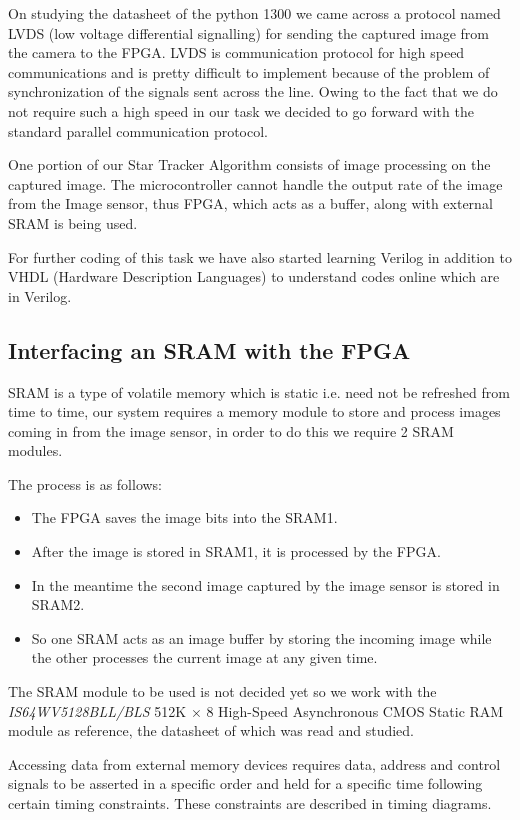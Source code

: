 \documentclass[../../main.tex]{subfiles}
\begin{document}
On studying the datasheet of the python 1300 we came across a protocol named LVDS (low voltage differential signalling) for sending the captured image from the camera to the FPGA. LVDS is communication protocol for high speed communications and is pretty difficult to implement because of the problem of synchronization of the signals sent across the line. Owing to the fact that we do not require such a high speed in our task we decided to go forward with the standard parallel communication protocol.

One portion of our Star Tracker Algorithm consists of image processing on the captured image.  The microcontroller cannot handle the output rate of the image from the Image sensor, thus FPGA, which acts as a buffer, along with external SRAM is being used. %

For further coding of this task we have also started learning Verilog in addition to VHDL (Hardware Description Languages) to understand codes online which are in Verilog.

\subsection{Interfacing an SRAM with the FPGA}
SRAM is a type of volatile memory which is static i.e. need not be refreshed from time to time, our system requires a memory module to store and process images coming in from the image sensor, in order to do this we require 2 SRAM modules.

The process is as follows:
\begin{itemize}
    \item The FPGA saves the image bits into the SRAM1.
    \item After the image is stored in SRAM1, it is processed by the FPGA.
    \item In the meantime the second image captured by the image sensor is stored in SRAM2.
    \item So one SRAM acts as an image buffer by storing the incoming image while the other processes the current image at any given time.
\end{itemize}

The SRAM module to be used is not decided yet so we work with the \textit{IS64WV5128BLL/BLS} 512K \(\times\) 8 High-Speed Asynchronous CMOS Static RAM module as reference, the datasheet of which was read and studied.

Accessing data from external memory devices requires data, address and control signals to be asserted in a specific order and held for a specific time following certain timing constraints. These constraints are described in timing diagrams.
\end{document}
